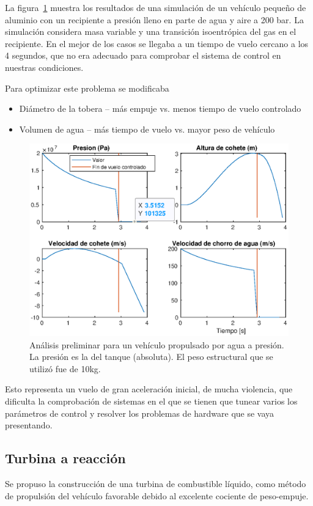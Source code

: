 \medskip

La figura~\ref{fig:bottlerocket} muestra los resultados de una simulación de un vehículo pequeño de aluminio con un recipiente a presión lleno en parte de agua y aire a 200 bar. La simulación considera masa variable y una transición isoentrópica del gas en el recipiente. En el mejor de los casos se llegaba a un tiempo de vuelo cercano a los 4 segundos, que no era adecuado para comprobar el sistema de control en nuestras condiciones. 

Para optimizar este problema se modificaba

\begin{itemize}
    \item Diámetro de la tobera -- más empuje vs. menos tiempo de vuelo controlado
    \item Volumen de agua -- más tiempo de vuelo vs. mayor peso de vehículo
\end{itemize}


\begin{figure}[!ht]
    \centering
    \includegraphics[width=0.8\linewidth]{fig/bottlerocket}
    \caption{Análisis preliminar para un vehículo propulsado por agua a presión. La presión es la del tanque (absoluta). El peso estructural que se utilizó fue de 10kg.}
    \label{fig:bottlerocket}
\end{figure}

Esto representa un vuelo de gran aceleración inicial, de mucha violencia, que dificulta la comprobación de sistemas en el que se tienen que tunear varios los parámetros de control y resolver los problemas de hardware que se vaya presentando. 

\subsection{Turbina a reacción}\label{ssec:turbina}
Se propuso la construcción de una turbina de combustible líquido, como método de propulsión
del vehículo favorable debido al excelente cociente de peso-empuje.

